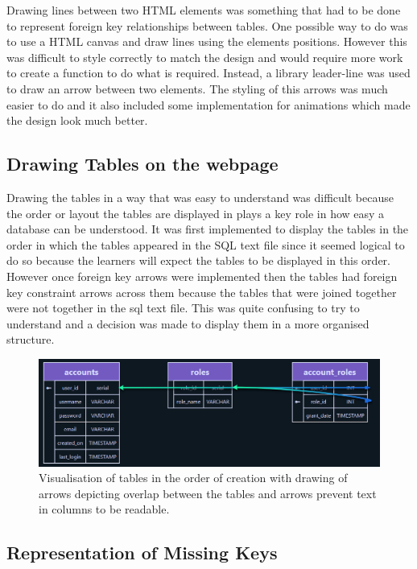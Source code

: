 Drawing lines between two HTML elements was something that had to be done to represent foreign key relationships between tables. One possible way to do was to use a HTML canvas and draw lines using the elements positions. However this was difficult to style correctly to match the design and would require more work to create a function to do what is required. Instead, a library leader-line \cite{leader-line} was used to draw an arrow between two elements. The styling of this arrows was much easier to do and it also included some implementation for animations which made the design look much better.

\subsection{Drawing Tables on the webpage}

Drawing the tables in a way that was easy to understand was difficult because the order or layout the tables are displayed in plays a key role in how easy a database can be understood. It was first implemented to display the tables in the order in which the tables appeared in the SQL text file since it seemed logical to do so because the learners will expect the tables to be displayed in this order. However once foreign key arrows were implemented then the tables had foreign key constraint arrows across them because the tables that were joined together were not together in the sql text file. This was quite confusing to try to understand and a decision was made to display them in a more organised structure. 

\begin{figure}[h!]
	\centering
	\includegraphics[width=\textwidth]{overlap}
	\caption{Visualisation of tables in the order of creation with drawing of arrows depicting overlap between the tables and arrows prevent text in columns to be readable.}
	\label{fig:overlap}
\end{figure}

\subsection{Representation of Missing Keys}

